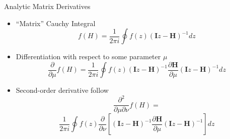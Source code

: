 \documentclass{beamer}
\begin{document}
\begin{frame}{Analytic Matrix Derivatives}
\begin{itemize}
	\item ``Matrix'' Cauchy	Integral
\[ f(H) = \frac{1}{2\pi i} \oint f(z) (\mathbf{I}z - \mathbf{H})^{-1} dz \]

	\item Differentiation with respect to some parameter $\mu$ 
	\[ \frac{\partial}{\partial \mu}f(H) = \frac{1}{2\pi i} \oint f(z) (\mathbf{I}z - \mathbf{H})^{-1} \frac{\partial \mathbf{H}}{\partial \mu} (\mathbf{I}z - \mathbf{H})^{-1} dz \]

	\item Second-order derivative follow
	\[ \frac{\partial^2}{\partial \mu \partial \nu}f(H) = \] 
	\[\frac{1}{2\pi i} \oint f(z) \frac{\partial}{\partial \nu} \left[ (\mathbf{I}z - \mathbf{H})^{-1} \frac{\partial \mathbf{H}}{\partial \mu} (\mathbf{I}z - \mathbf{H})^{-1} \right] dz  \]
\end{itemize}
\end{frame}
\end{document}
